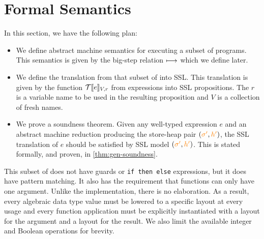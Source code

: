 \section{Formal Semantics}
\label{sec:semantics}



In this section, we have the following plan:

\begin{itemize}
  \item We define abstract machine semantics for executing a subset of \tool programs. This semantics
    is given by the big-step relation $\longmapsto$ which we define later.
  \item We define the translation from that subset of \tool into SSL. This translation is given by the
    function $\mathcal{T}\llbracket e\rrbracket_{V,r}$ from \tool expressions into SSL propositions. The $r$ is a variable name to
    be used in the resulting proposition and $V$ is a collection of fresh names.
  \item We prove a soundness theorem. Given any well-typed expression $e$ and an abstract machine reduction producing
    the store-heap pair $({\color{orange} \sigma'}, {\color{orange} h'})$, the SSL translation of $e$ should be satisfied by SSL model $({\color{orange} \sigma'}, {\color{orange} h'})$. This is stated formally, and proven,
    in \autoref{thm:gen-soundness}.
\end{itemize}

This subset of \tool does not have guards or \verb|if then else| expressions, but it does have pattern
matching. It also has the requirement that functions can only have one argument. Unlike the implementation, there
is no elaboration. As a result, every algebraic data type value must be lowered to a specific layout at every usage
and every function application must be explicitly instantiated with a layout for the argument and a layout for the result. We
also limit the available integer and Boolean operations for brevity.

